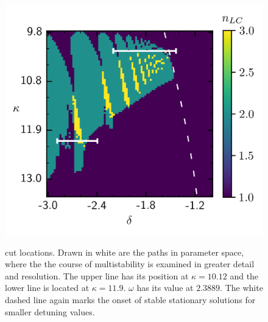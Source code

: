 %     
\begin{figure}[H]
    \caption{cut locations. Drawn in white are the paths in parameter space, where the the course of multistability is examined in greater detail and resolution. The upper line has its position at $\kappa=10.12$ and the lower line is located at $\kappa=11.9$. $\omega$ has its value at $2.3889$. The white dashed line again marks the onset of stable stationary solutions for smaller detuning values.}
    \includegraphics{pictures/multistab_cuts.png}
    \label{fig:delta_cut_traj}
\end{figure}


